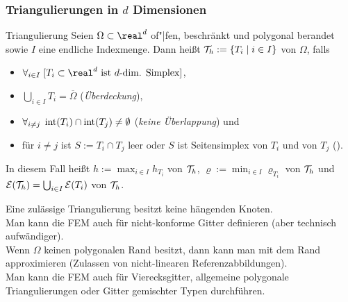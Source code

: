 \pagebreak

\subsubsection{%
    Triangulierungen in \texorpdfstring{$d$}{d} Dimensionen%
}

\begin{Def}{Triangulierung}
    Seien $\Omega \subset \real^d$ of"|fen, beschränkt und polygonal berandet sowie
    $I$ eine endliche Indexmenge.
    Dann heißt $\mathcal{T}_h := \{T_i \;|\; i \in I\}$ 
    von $\Omega$, falls
    \begin{itemize}
        \item
        $\forall_{i \in I}\; [\text{$T_i \subset \real^d$ ist $d$-dim. Simplex}]$,
        
        \item
        $\bigcup_{i \in I} T_i = \overline{\Omega}$
        (\emph{Überdeckung}),
        
        \item
        $\forall_{i \not= j}\; \operatorname{int}(T_i) \cap \operatorname{int}(T_j) \not= \emptyset$
        (\emph{keine Überlappung}) und
        
        \item
        für $i \not= j$ ist $S := T_i \cap T_j$
        leer oder $S$ ist Seitensimplex von $T_i$ und von $T_j$
        ().
    \end{itemize}
    In diesem Fall heißt
    $h := \max_{i \in I} h_{T_i}$  von $\mathcal{T}_h$,
    $\varrho := \min_{i \in I} \varrho_{T_i}$  von $\mathcal{T}_h$ und
    $\mathcal{E}(\mathcal{T}_h) = \bigcup_{i \in I} \mathcal{E}(T_i)$  von $\mathcal{T}_h$.
\end{Def}

\begin{Bem}
    Eine zulässige Triangulierung besitzt keine hängenden Knoten.\\
    Man kann die FEM auch für nicht-konforme Gitter definieren (aber technisch aufwändiger).\\
    Wenn $\Omega$ keinen polygonalen Rand besitzt, dann kann man mit
     dem Rand approximieren
    (Zulassen von nicht-linearen Referenzabbildungen).\\
    Man kann die FEM auch für Vierecksgitter, allgemeine polygonale Triangulierungen
    oder Gitter gemischter Typen durchführen.
\end{Bem}

